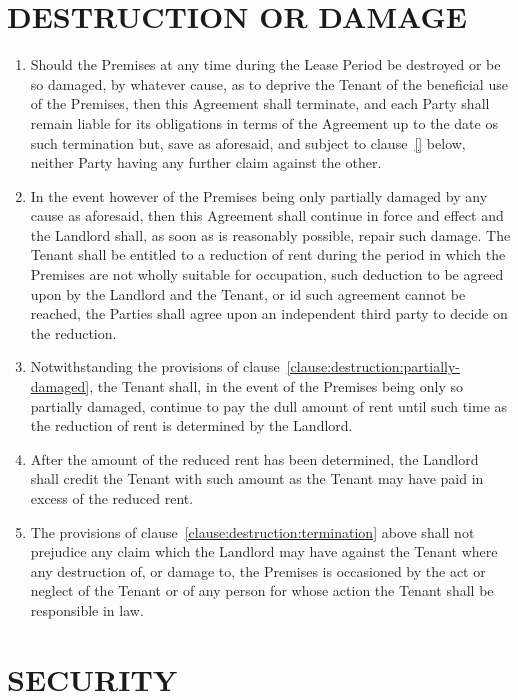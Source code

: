\documentclass[11pt]{article}
\begin{document}
\section{\uppercase{destruction or damage}}
\label{sec:destruction-or-damage}

\begin{enumerate}
	\item Should the Premises at any time during the Lease Period be destroyed or be so damaged, by whatever cause, as to deprive the  Tenant of the beneficial use of the Premises, then this Agreement shall terminate, and each Party shall remain liable for its obligations in terms of the Agreement up to the date os such termination but, save as aforesaid, and subject to clause~\ref{} below, neither Party having any further claim against the other. \label{clause:destruction:termination}
	\item In the event however of the Premises being only partially damaged by any cause as aforesaid, then this Agreement shall continue in force and effect and the Landlord shall, as soon as is reasonably possible, repair such damage. The Tenant shall be entitled to a reduction of rent during the period in which the Premises are not wholly suitable for occupation, such deduction to be agreed upon by the Landlord and the Tenant, or id such agreement cannot be reached, the Parties shall agree upon an independent third party to decide on the reduction. \label{clause:destruction:partially-damaged}
	\item Notwithstanding the provisions of clause~\ref{clause:destruction:partially-damaged}, the Tenant shall, in the event of the Premises being only so partially damaged, continue to pay the dull amount of rent until such time as the reduction of rent is determined by the Landlord.
	\item After the amount of the reduced rent has been determined, the Landlord shall credit the Tenant with such amount as the Tenant may have paid in excess of the reduced rent.
	\item The provisions of clause~\ref{clause:destruction:termination} above shall not prejudice any claim which the Landlord may have against the Tenant where any destruction of, or damage to, the Premises is occasioned by the act or neglect of the Tenant or of any person for whose action the Tenant shall be responsible in law.
\end{enumerate}

\section{\uppercase{security}}
\label{sec:security}
\end{document}
